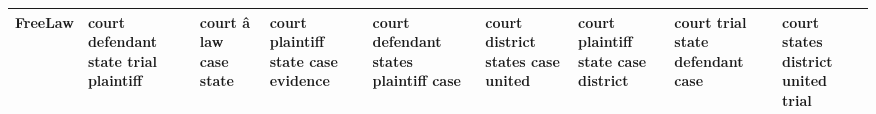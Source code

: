 \documentclass[11pt,a4paper]{article}
\begin{document}
\begin{appendices}
\begin{table}[htb]
\begin{tiny}
\begin{tabular}{|p{}|p{}|p{}|p{}|p{}|p{}|p{}|p{}|p{}|}
    FreeLaw & court \newline defendant \newline state \newline trial \newline plaintiff & court \newline â \newline law \newline case \newline state & court \newline plaintiff \newline state \newline case \newline evidence & court \newline defendant \newline states \newline plaintiff \newline case & court \newline district \newline states \newline case \newline united & court \newline plaintiff \newline state \newline case \newline district & court \newline trial \newline state \newline defendant \newline case & court \newline states \newline district \newline united \newline trial\\\hline

\end{tabular}
\end{tiny}
\end{table}
\end{appendices}
\end{document}
